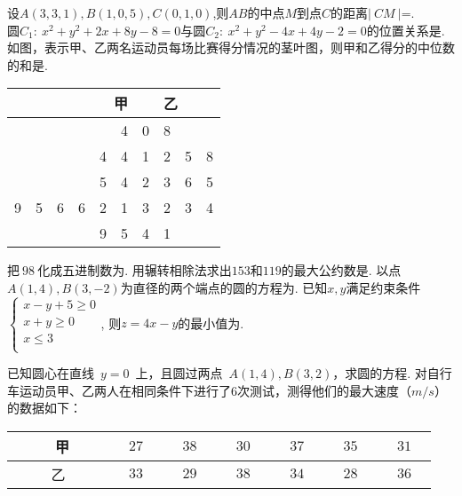 \documentclass{BHCexam}
\begin{document}
\begin{questions}
\begin{flushright}
\begin{tikzpicture}[scale=0.8]
\end{tikzpicture}
\end{flushright}
\qs 设$ A(3,3,1),B(1,0,5),C(0,1,0) $,则$ AB $的中点$ M $到点$ C $的距离$ \left| ~CM~ \right| $=\tk.\\
\qs 圆$C_1:~x^2+y^2+2x+8y-8=0$与圆$C_2:~x^2+y^2-4x+4y-2=0$的位置关系是\tk.\\
\qs 如图，表示甲、乙两名运动员每场比赛得分情况的茎叶图，则甲和乙得分的中位数的和是\tk.\\
\vspace{-4cm}
\begin{flushright}
\begin{tabular}{r|c|l}
甲&    &乙 \\
\hline
4&0&8  \\
4~~4&1&2~~5~~8  \\
5~~4&2&3~~6~~5  \\
9~~5~~6~~6~~2~~1&3&2~~3~~4  \\
9~~5&4&1
\end{tabular}
\end{flushright}
\tiankong
\qs 把$~98~$化成五进制数为\ltk.
\qs 用辗转相除法求出$153$和$119$的最大公约数是\ltk.
\qs 以点$A(1,4),B(3,-2)$为直径的两个端点的圆的方程为\ltk.
\qs 已知$x,y$满足约束条件%
$\begin{cases}
x-y+5\geq 0 \\
x+y\geq 0  \\
x\leq 3  \\
\end{cases}$,
则$z=4x-y$的最小值为\ltk.

\jianda
\qs 已知圆心在直线~$y=0$~上，且圆过两点~$A(1,4),B(3,2)$，求圆的方程.
\vspace{8cm}
\qs 对自行车运动员甲、乙两人在相同条件下进行了$6$次测试，测得他们的最大速度（$m/s$）的数据如下：
\begin{center}
\begin{tabular}{|c|c|c|c|c|c|c|}
\hline
~~~~~甲~~~~&$~~~~27~~~~$&$~~~~38~~~~$&$~~~~30~~~~$&$~~~~37~~~~$&$~~~~35~~~~$&$~~~~31~~~~$  \\
\hline
乙&$33$&$29$&$38$&$34$&$28$&$36$  \\
\hline
\end{tabular}
\end{center}
\end{questions}
\end{document}
